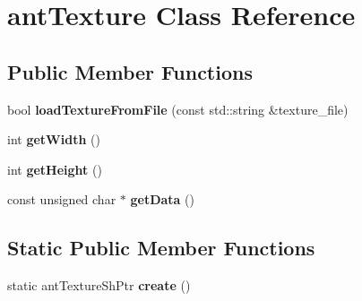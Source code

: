 \hypertarget{classant_texture}{\section{ant\+Texture Class Reference}
\label{classant_texture}
}
\subsection*{Public Member Functions}
\begin{DoxyCompactItemize}
\item 
\hypertarget{classant_texture_a2dacc1d8b3e6eb518d113aa32ecabe25}{bool {\bfseries load\+Texture\+From\+File} (const std\+::string \&texture\+\_\+file)}\label{classant_texture_a2dacc1d8b3e6eb518d113aa32ecabe25}

\item 
\hypertarget{classant_texture_af9ba3984572f44a5fe427eacb97e24ea}{int {\bfseries get\+Width} ()}\label{classant_texture_af9ba3984572f44a5fe427eacb97e24ea}

\item 
\hypertarget{classant_texture_a2f551d638f9a1439160c809acc95264b}{int {\bfseries get\+Height} ()}\label{classant_texture_a2f551d638f9a1439160c809acc95264b}

\item 
\hypertarget{classant_texture_af222a9f8a0745455dfddd42c306746bb}{const unsigned char $\ast$ {\bfseries get\+Data} ()}\label{classant_texture_af222a9f8a0745455dfddd42c306746bb}

\end{DoxyCompactItemize}
\subsection*{Static Public Member Functions}
\begin{DoxyCompactItemize}
\item 
\hypertarget{classant_texture_a2bff013dfd61fa9717e0991c2d4b5450}{static ant\+Texture\+Sh\+Ptr {\bfseries create} ()}\label{classant_texture_a2bff013dfd61fa9717e0991c2d4b5450}

\end{DoxyCompactItemize}
